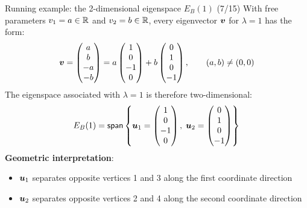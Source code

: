 \documentclass[aspectratio=169]{beamer}\usepackage[]{graphicx}\usepackage[]{xcolor}
\begin{document}
\begin{frame}{Running example: the 2-dimensional eigenspace $E_B(1)$ (7/15)}
With free parameters $v_1 = a \in \mathbb{R}$ and $v_2 = b \in \mathbb{R}$, every eigenvector $\bm{v}$ for $\lambda = 1$ has the form:
\[
\bm{v} = \begin{pmatrix} a \\ b \\ -a \\ -b \end{pmatrix} = a \begin{pmatrix} 1 \\ 0 \\ -1 \\ 0 \end{pmatrix} + b \begin{pmatrix} 0 \\ 1 \\ 0 \\ -1 \end{pmatrix}, \qquad (a, b) \ne (0, 0)
\]
\vfill
The eigenspace associated with $\lambda = 1$ is therefore two-dimensional:
\[
E_B(1) = \mathsf{span}\left\{ \bm{u}_1 = \begin{pmatrix} 1 \\ 0 \\ -1 \\ 0 \end{pmatrix}, \; \bm{u}_2 = \begin{pmatrix} 0 \\ 1 \\ 0 \\ -1 \end{pmatrix} \right\}
\]
\vfill
\textbf{Geometric interpretation}:
\begin{itemize}
\item $\bm{u}_1$ separates opposite vertices 1 and 3 along the first coordinate direction
\item $\bm{u}_2$ separates opposite vertices 2 and 4 along the second coordinate direction
\end{itemize}
\end{frame}
\end{document}
